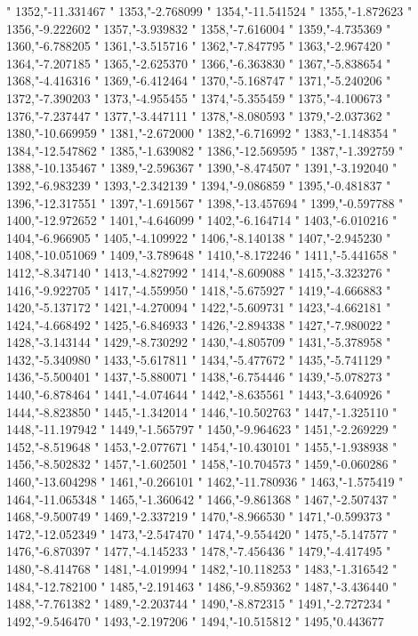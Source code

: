 "
1352,"-11.331467
"
1353,"-2.768099
"
1354,"-11.541524
"
1355,"-1.872623
"
1356,"-9.222602
"
1357,"-3.939832
"
1358,"-7.616004
"
1359,"-4.735369
"
1360,"-6.788205
"
1361,"-3.515716
"
1362,"-7.847795
"
1363,"-2.967420
"
1364,"-7.207185
"
1365,"-2.625370
"
1366,"-6.363830
"
1367,"-5.838654
"
1368,"-4.416316
"
1369,"-6.412464
"
1370,"-5.168747
"
1371,"-5.240206
"
1372,"-7.390203
"
1373,"-4.955455
"
1374,"-5.355459
"
1375,"-4.100673
"
1376,"-7.237447
"
1377,"-3.447111
"
1378,"-8.080593
"
1379,"-2.037362
"
1380,"-10.669959
"
1381,"-2.672000
"
1382,"-6.716992
"
1383,"-1.148354
"
1384,"-12.547862
"
1385,"-1.639082
"
1386,"-12.569595
"
1387,"-1.392759
"
1388,"-10.135467
"
1389,"-2.596367
"
1390,"-8.474507
"
1391,"-3.192040
"
1392,"-6.983239
"
1393,"-2.342139
"
1394,"-9.086859
"
1395,"-0.481837
"
1396,"-12.317551
"
1397,"-1.691567
"
1398,"-13.457694
"
1399,"-0.597788
"
1400,"-12.972652
"
1401,"-4.646099
"
1402,"-6.164714
"
1403,"-6.010216
"
1404,"-6.966905
"
1405,"-4.109922
"
1406,"-8.140138
"
1407,"-2.945230
"
1408,"-10.051069
"
1409,"-3.789648
"
1410,"-8.172246
"
1411,"-5.441658
"
1412,"-8.347140
"
1413,"-4.827992
"
1414,"-8.609088
"
1415,"-3.323276
"
1416,"-9.922705
"
1417,"-4.559950
"
1418,"-5.675927
"
1419,"-4.666883
"
1420,"-5.137172
"
1421,"-4.270094
"
1422,"-5.609731
"
1423,"-4.662181
"
1424,"-4.668492
"
1425,"-6.846933
"
1426,"-2.894338
"
1427,"-7.980022
"
1428,"-3.143144
"
1429,"-8.730292
"
1430,"-4.805709
"
1431,"-5.378958
"
1432,"-5.340980
"
1433,"-5.617811
"
1434,"-5.477672
"
1435,"-5.741129
"
1436,"-5.500401
"
1437,"-5.880071
"
1438,"-6.754446
"
1439,"-5.078273
"
1440,"-6.878464
"
1441,"-4.074644
"
1442,"-8.635561
"
1443,"-3.640926
"
1444,"-8.823850
"
1445,"-1.342014
"
1446,"-10.502763
"
1447,"-1.325110
"
1448,"-11.197942
"
1449,"-1.565797
"
1450,"-9.964623
"
1451,"-2.269229
"
1452,"-8.519648
"
1453,"-2.077671
"
1454,"-10.430101
"
1455,"-1.938938
"
1456,"-8.502832
"
1457,"-1.602501
"
1458,"-10.704573
"
1459,"-0.060286
"
1460,"-13.604298
"
1461,"-0.266101
"
1462,"-11.780936
"
1463,"-1.575419
"
1464,"-11.065348
"
1465,"-1.360642
"
1466,"-9.861368
"
1467,"-2.507437
"
1468,"-9.500749
"
1469,"-2.337219
"
1470,"-8.966530
"
1471,"-0.599373
"
1472,"-12.052349
"
1473,"-2.547470
"
1474,"-9.554420
"
1475,"-5.147577
"
1476,"-6.870397
"
1477,"-4.145233
"
1478,"-7.456436
"
1479,"-4.417495
"
1480,"-8.414768
"
1481,"-4.019994
"
1482,"-10.118253
"
1483,"-1.316542
"
1484,"-12.782100
"
1485,"-2.191463
"
1486,"-9.859362
"
1487,"-3.436440
"
1488,"-7.761382
"
1489,"-2.203744
"
1490,"-8.872315
"
1491,"-2.727234
"
1492,"-9.546470
"
1493,"-2.197206
"
1494,"-10.515812
"
1495,"0.443677
